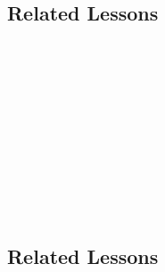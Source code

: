 \subsection{Related Lessons}
\fourdFour{}\\
\fourdFive{}\\
\fourdSix{}\\
\fourdSeven{}\\
\fourdEight{}\\
\foureOne{}\\
\foureTwo{}\\
\foureTwelve{}\\
\foureThirteen{}\\
\fourFKTwentyFour{}\\
%
\subsection{Related Lessons} 
\fourdThree{}\\
\fourdFour{}\\
\fourFKTwentyFour{}\\
